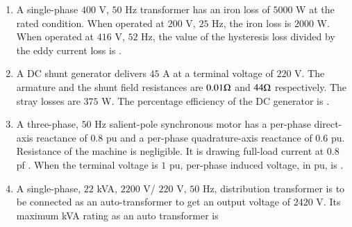 \documentclass[journal,12pt,onecolumn]{IEEEtran}
\theoremstyle{remark}
\begin{document}
\begin{enumerate}[start=1, label=Q.\arabic*]
    \hfill{}

    \item A single-phase $400$ V, $50$ Hz transformer has an iron loss of $5000$ W at the rated condition. When operated at $200$ V, $25$ Hz, the iron loss is $2000$ W. When operated at $416$ V, $52$ Hz, the value of the hysteresis loss divided by the eddy current loss is \underline{\hspace{2cm}}.

    \hfill{}

    \item A DC shunt generator delivers $45$ A at a terminal voltage of $220$ V. The armature and the shunt field resistances are $0.01 \ohm$ and $44 \ohm$ respectively. The stray losses are $375$ W. The percentage efficiency of the DC generator is \underline{\hspace{2cm}}.

    \hfill{}

    \item A three-phase, $50$ Hz salient-pole synchronous motor has a per-phase direct-axis reactance  of $0.8$ pu and a per-phase quadrature-axis reactance  of $0.6$ pu. Resistance of the machine is negligible. It is drawing full-load current at $0.8$ pf . When the terminal voltage is $1$ pu, per-phase induced voltage, in pu, is \underline{\hspace{2cm}}.


    \hfill{}

    \item A single-phase, $22$ kVA, $2200$ V/ $220$ V, $50$ Hz, distribution transformer is to be connected as an auto-transformer to get an output voltage of $2420$ V. Its maximum kVA rating as an auto transformer is
    \begin{enumerate}
    \end{enumerate}

    \hfill{}


\end{enumerate}
\end{document}
